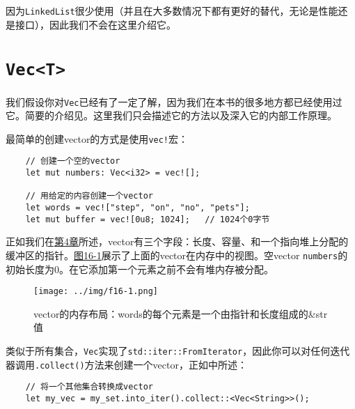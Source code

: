 




因为\texttt{LinkedList}很少使用（并且在大多数情况下都有更好的替代，无论是性能还是接口），因此我们不会在这里介绍它。

\section{\texttt{Vec<T>}}

我们假设你对\texttt{Vec}已经有了一定了解，因为我们在本书的很多地方都已经使用过它。简要的介绍见。这里我们只会描述它的方法以及深入它的内部工作原理。

最简单的创建vector的方式是使用\texttt{vec!}宏：
\begin{verbatim}
    // 创建一个空的vector
    let mut numbers: Vec<i32> = vec![];

    // 用给定的内容创建一个vector
    let words = vec!["step", "on", "no", "pets"];
    let mut buffer = vec![0u8; 1024];   // 1024个0字节
\end{verbatim}

正如我们在\hyperref[ch04]{第4章}所述，vector有三个字段：长度、容量、和一个指向堆上分配的缓冲区的指针。\hyperref[f16-1]{图16-1}展示了上面的vector在内存中的视图。空vector \texttt{numbers}的初始长度为0。在它添加第一个元素之前不会有堆内存被分配。

\begin{figure}[htbp]
    \centering
    \texttt{[image: ../img/f16-1.png]}
    \caption{vector的内存布局：words的每个元素是一个由指针和长度组成的\&str值}
    \label{f16-1}
\end{figure}

类似于所有集合，\texttt{Vec}实现了\texttt{std::iter::FromIterator}，因此你可以对任何迭代器调用\texttt{.collect()}方法来创建一个vector，正如中所述：
\begin{verbatim}
    // 将一个其他集合转换成vector
    let my_vec = my_set.into_iter().collect::<Vec<String>>();
\end{verbatim}

